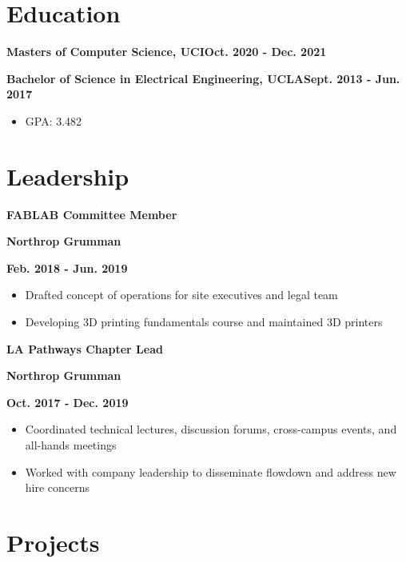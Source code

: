 \documentclass[12pt]{article}
\newcommand\textbox[1]{\parbox{.333\textwidth}{#1}}
\newcommand{\textlcr}[3]{\textbox{\textbf{#1}\hfill}\textbox{\hfil \textbf{#2}\hfil}\textbox{\hfill \textbf{#3}}}
\begin{document}
\section*{Education}
\vspace*{-1em}\makebox[\linewidth]{\rule{\textwidth}{0.4pt}}
\textbf{Masters of Computer Science, UCI}\hfill\textbf{Oct. 2020 - Dec. 2021}

\textbf{Bachelor of Science in Electrical Engineering, UCLA}\hfill\textbf{Sept. 2013 - Jun. 2017}
\begin{itemize}
\item GPA: 3.482
\end{itemize}


\section*{Leadership}
\vspace*{-1em}\makebox[\linewidth]{\rule{\textwidth}{0.4pt}}

\textlcr{FABLAB Committee Member}{Northrop Grumman}{Feb. 2018 - Jun. 2019}
\begin{itemize}
\item Drafted concept of operations for site executives and legal team
\item Developing 3D printing fundamentals course and maintained 3D printers
\end{itemize}

\bigskip
\textlcr{LA Pathways Chapter Lead}{Northrop Grumman}{Oct. 2017 - Dec. 2019}
\begin{itemize}
\item Coordinated technical lectures, discussion forums, cross-campus events, and all-hands meetings
\item Worked with company leadership to disseminate flowdown and address new hire concerns
\end{itemize}

\section*{Projects}
\vspace*{-1em}\makebox[\linewidth]{\rule{\textwidth}{0.4pt}}
\end{document}
